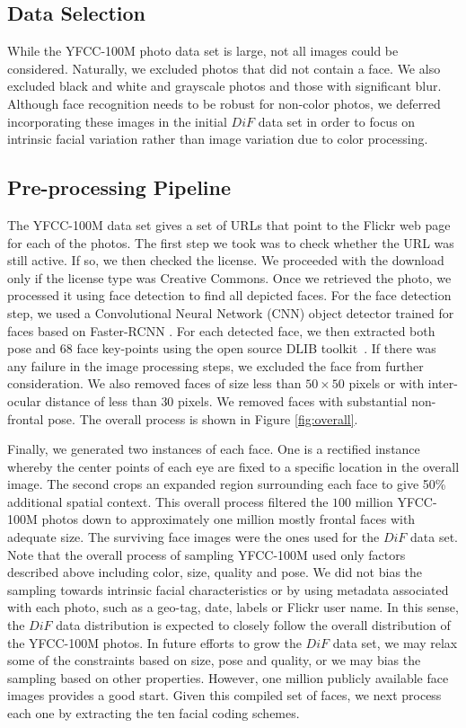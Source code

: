 \documentclass[letterpaper,11pt]{article}
\begin{document}
\subsection{Data Selection}

While the YFCC-100M photo data set is large, not all images could be considered.  Naturally, we excluded photos that did not contain a face.  We also excluded black and white and grayscale photos and those with significant blur.  Although face recognition needs to be robust for non-color photos, we deferred incorporating these images in the initial $DiF$ data set in order to focus on intrinsic facial variation rather than image variation due to color processing.

\subsection{Pre-processing Pipeline}

The YFCC-100M data set gives a set of URLs that point to the Flickr web page for each of the photos.   The first step we took was to check whether the URL was still active.  If so, we then checked the license.  We proceeded with the download only if the license type was Creative Commons. Once we retrieved the photo, we processed it using face detection to find all depicted faces.  For the face detection step, we used a Convolutional Neural Network (CNN) object detector trained for faces based on Faster-RCNN \cite{fasterrcnn_NIPS15}. For each detected face, we then extracted both pose and $68$ face key-points using the open source DLIB toolkit~\cite{DLIB09}. If there was any failure in the image processing steps, we excluded the face from further consideration.  We also removed faces of size less than $50 \times 50$ pixels or with inter-ocular distance of less than $30$ pixels.  We removed faces with substantial non-frontal pose.  The overall process is shown in Figure \ref{fig:overall}.

Finally, we generated two instances of each face.  One is a rectified instance whereby the center points of each eye are fixed to a specific location in the overall image.  The second crops an expanded region surrounding each face to give 50\% additional spatial context.  This overall process filtered the $100$ million YFCC-100M photos down to approximately one million mostly frontal faces with adequate size.  The surviving face images were the ones used for the $DiF$ data set.  Note that the overall process of sampling YFCC-100M used only factors described above including color, size, quality and pose.  We did not bias the sampling towards intrinsic facial characteristics or by using metadata associated with each photo, such as a geo-tag, date, labels or Flickr user name.  In this sense, the $DiF$ data distribution is expected to closely follow the overall distribution of the YFCC-100M photos.  In future efforts to grow the $DiF$ data set, we may relax some of the constraints based on size, pose and quality, or we may bias the sampling based on other properties.  However, one million publicly available face images provides a good start.  Given this compiled set of faces, we next process each one by extracting the ten facial coding schemes.
\end{document}
